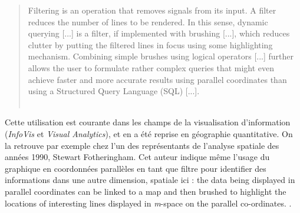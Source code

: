 \begin{quotation}\vspace{-0.5cm}
	\og Filtering is an operation that removes signals from its input. A filter reduces the number of lines to be rendered. In this sense, dynamic querying [...] is a filter, if implemented with brushing [...], which reduces clutter by putting the filtered lines in focus using some highlighting mechanism. Combining simple brushes using logical operators [...] further allows the user to formulate rather complex queries that might even achieve faster and more accurate results using parallel coordinates than using a Structured Query Language (SQL) [...].\fg{}\\
	\mbox{}~ \hfill \cite[p. 13]{heinrich_state_2013}
\end{quotation}


Cette utilisation est courante dans les champs de la visualisation d'information (\textit{InfoVis} et \textit{Visual Analytics}), et en a été reprise en géographie quantitative.
On la retrouve par exemple chez l'un des représentants de l'analyse spatiale des années 1990, Stewart Fotheringham.
Cet auteur indique même l'usage du graphique en coordonnées parallèles en tant que filtre pour identifier des informations dans une autre dimension, spatiale ici : \og the data being displayed in parallel coordinates can be linked to a map and then brushed to highlight the locations of interesting lines displayed in \textit{m}-space on the parallel co-ordinates.\fg{} \autocite{fotheringham_trends_1999}.

